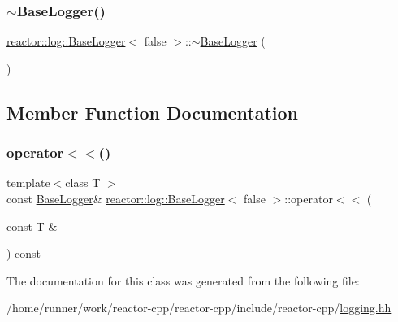 \mbox{\label{classreactor_1_1log_1_1BaseLogger_3_01false_01_4_a3b4c1ce4ef1f745c151fbbafceba3013}} 
\subsubsection{\texorpdfstring{$\sim$\+Base\+Logger()}{~BaseLogger()}}
{\footnotesize\ttfamily \hyperlink{classreactor_1_1log_1_1BaseLogger}{reactor\+::log\+::\+Base\+Logger}$<$ false $>$\+::$\sim$\hyperlink{classreactor_1_1log_1_1BaseLogger}{Base\+Logger} (\begin{DoxyParamCaption}{ }\end{DoxyParamCaption})\hspace{0.3cm}{\ttfamily [inline]}}



\subsection{Member Function Documentation}
\mbox{\label{classreactor_1_1log_1_1BaseLogger_3_01false_01_4_a871b558bb1f64ed564deb55a1286d56c}} 
\subsubsection{\texorpdfstring{operator$<$$<$()}{operator<<()}}
{\footnotesize\ttfamily template$<$class T $>$ \\
const \hyperlink{classreactor_1_1log_1_1BaseLogger}{Base\+Logger}\& \hyperlink{classreactor_1_1log_1_1BaseLogger}{reactor\+::log\+::\+Base\+Logger}$<$ false $>$\+::operator$<$$<$ (\begin{DoxyParamCaption}\item[{const T \&}]{ }\end{DoxyParamCaption}) const\hspace{0.3cm}{\ttfamily [inline]}}



The documentation for this class was generated from the following file\+:\begin{DoxyCompactItemize}
\item 
/home/runner/work/reactor-\/cpp/reactor-\/cpp/include/reactor-\/cpp/\hyperlink{logging_8hh}{logging.\+hh}\end{DoxyCompactItemize}
